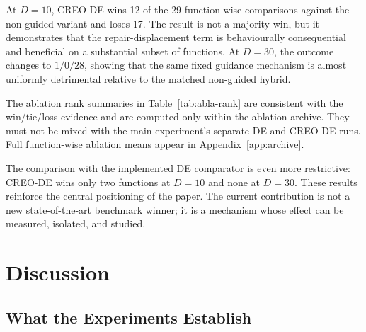 \documentclass[a4paper,fleqn]{cas-sc}
\begin{document}
At $D=10$, CREO-DE wins 12 of the 29 function-wise comparisons against the non-guided variant and loses 17. The result is not a majority win, but it demonstrates that the repair-displacement term is behaviourally consequential and beneficial on a substantial subset of functions. At $D=30$, the outcome changes to $1/0/28$, showing that the same fixed guidance mechanism is almost uniformly detrimental relative to the matched non-guided hybrid.

\begin{table}[t]
\centering
\caption{Experiment 2: three-method ablation archive ranks across 29 functions, computed separately for each dimension from unrounded archived function-wise means.}
\label{tab:abla-rank}
\footnotesize
{}
\end{table}

The ablation rank summaries in Table~\ref{tab:abla-rank} are consistent with the win/tie/loss evidence and are computed only within the ablation archive. They must not be mixed with the main experiment's separate DE and CREO-DE runs. Full function-wise ablation means appear in Appendix~\ref{app:archive}.

The comparison with the implemented DE comparator is even more restrictive: CREO-DE wins only two functions at $D=10$ and none at $D=30$. These results reinforce the central positioning of the paper. The current contribution is not a new state-of-the-art benchmark winner; it is a mechanism whose effect can be measured, isolated, and studied.

\section{Discussion}

\subsection{What the Experiments Establish}
\end{document}

